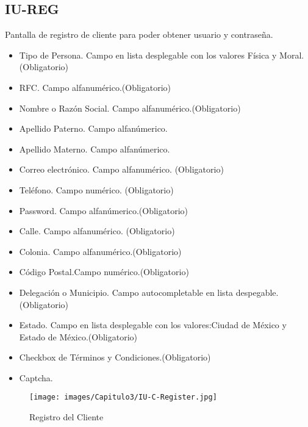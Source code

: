 \subsection{IU-REG}
    Pantalla de registro de cliente para poder obtener usuario y contraseña.
\begin{itemize}
    \item Tipo de Persona. Campo en lista desplegable con los valores Física y Moral.(Obligatorio)
    \item RFC. Campo alfanumérico.(Obligatorio)
    \item Nombre o Razón Social. Campo alfanumérico.(Obligatorio)
    \item Apellido Paterno. Campo alfanúmerico.
    \item Apellido Materno. Campo alfanúmerico.
    \item Correo electrónico. Campo alfanumérico. (Obligatorio)
    \item Teléfono. Campo numérico. (Obligatorio)
    \item Password. Campo alfanúmerico.(Obligatorio)
    \item Calle. Campo alfanumérico. (Obligatorio)
    \item Colonia. Campo alfanumérico.(Obligatorio)
    \item Código Postal.Campo numérico.(Obligatorio)
    \item Delegación o Municipio. Campo autocompletable en lista despegable. (Obligatorio) 
    \item Estado. Campo en lista desplegable con los valores:Ciudad de México y Estado de México.(Obligatorio)
    \item Checkbox de Términos y Condiciones.(Obligatorio)
    \item Captcha.
\end{itemize}
\begin{figure}[htbp!]
    \centering
    \texttt{[image: images/Capitulo3/IU-C-Register.jpg]}
    \caption{Registro del Cliente}
    \label{fig:my_label}
\end{figure}
\clearpage

\hypertarget{IU:IU-GI-AE}{}
